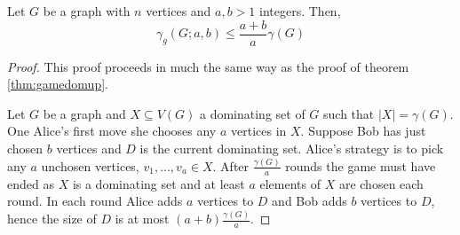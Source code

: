 \begin{theorem} 
    Let $G$ be a graph with $n$ vertices and $a,b>1$ integers. Then,
    \[\gamma_{g}(G;a,b) \leq \frac{a+b}{a}\gamma(G)\]
\end{theorem}
\begin{proof}
    This proof proceeds in much the same way as the proof of theorem \ref{thm:gamedomup}.
    
   Let $G$ be a graph and $X\subseteq V(G)$ a dominating set of $G$ such that $|X| = \gamma(G)$. One Alice's first move she chooses any $a$ vertices in $X$. Suppose Bob has just chosen $b$ vertices and $D$ is the current dominating set. Alice's strategy is to pick any $a$ unchosen vertices, $v_1,\dots,v_a \in X$. After $\frac{\gamma(G)}{a}$ rounds the game must have ended as $X$ is a dominating set and at least $a$ elements of $X$ are chosen each round. In each round Alice adds $a$ vertices to $D$ and Bob adds $b$ vertices to $D$, hence the size of $D$ is at most $(a+b)\frac{\gamma(G)}{a}$.
\end{proof}













